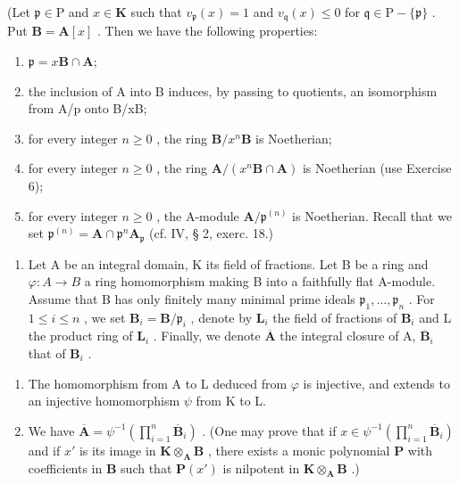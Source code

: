 (Let \(\mathfrak{p} \in \mathrm{P}\) and \(x \in \mathbf{K}\) such that \(v_{\mathfrak{p}}(x) = 1\) and \(v_{\mathfrak{q}}(x) \leqslant 0\) for \(\mathfrak{q} \in \mathrm{P} - \{\mathfrak{p}\}\) . Put \(\mathbf{B} = \mathbf{A}[x]\) . Then we have the following properties:

\begin{enumerate}
\def\labelenumi{(\roman{enumi})}
\item
  \(\mathfrak{p} = x\mathbf{B}\cap \mathbf{A};\)
\item
  the inclusion of A into B induces, by passing to quotients, an isomorphism from A/p onto B/xB;
\item
  for every integer \(n \geqslant 0\) , the ring \(\mathbf{B}/x^{n}\mathbf{B}\) is Noetherian;
\item
  for every integer \(n \geqslant 0\) , the ring \(\mathbf{A}/(x^n\mathbf{B} \cap \mathbf{A})\) is Noetherian (use Exercise 6);
\item
  for every integer \(n \geqslant 0\) , the A-module \(\mathbf{A}/\mathfrak{p}^{(n)}\) is Noetherian. Recall that we set \(\mathfrak{p}^{(n)} = \mathbf{A} \cap \mathfrak{p}^n\mathbf{A}_{\mathfrak{p}}\) (cf. IV, § 2, exerc. 18.)
\end{enumerate}

\begin{enumerate}
\def\labelenumi{\arabic{enumi})}
\setcounter{enumi}{7}
\tightlist
\item
  Let A be an integral domain, K its field of fractions. Let B be a ring and \(\varphi: A \to B\) a ring homomorphism making B into a faithfully flat A-module. Assume that B has only finitely many minimal prime ideals \(\mathfrak{p}_1, \ldots, \mathfrak{p}_n\) . For \(1 \leqslant i \leqslant n\) , we set \(\mathbf{B}_i = \mathbf{B} / \mathfrak{p}_i\) , denote by \(\mathbf{L}_i\) the field of fractions of \(\mathbf{B}_i\) and L the product ring of \(\mathbf{L}_i\) . Finally, we denote \(\overline{\mathbf{A}}\) the integral closure of A, \(\overline{\mathbf{B}}_i\) that of \(\mathbf{B}_i\) .
\end{enumerate}

\begin{enumerate}
\def\labelenumi{\alph{enumi})}
\item
  The homomorphism from A to L deduced from \(\varphi\) is injective, and extends to an injective homomorphism \(\psi\) from K to L.
\item
  We have \(\overline{\mathbf{A}} = \psi^{-1}(\prod_{i=1}^{n} \overline{\mathbf{B}}_i)\) . (One may prove that if \(x \in \psi^{-1}(\prod_{i=1}^{n} \overline{\mathbf{B}}_i)\) and if \(x'\) is its image in \(\mathbf{K} \otimes_{\mathbf{A}} \mathbf{B}\) , there exists a monic polynomial \(\mathbf{P}\) with coefficients in \(\mathbf{B}\) such that \(\mathbf{P}(x')\) is nilpotent in \(\mathbf{K} \otimes_{\mathbf{A}} \mathbf{B}\) .)
\end{enumerate}

